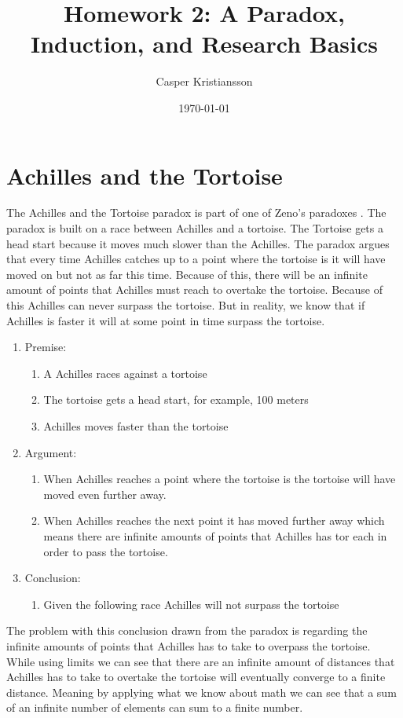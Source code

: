 \documentclass{article}
\title{Homework 2: A Paradox, Induction, and Research Basics}
\author{Casper Kristiansson}
\date{\today}
\begin{document}
\maketitle

\section{Achilles and the Tortoise}
The Achilles and the Tortoise paradox is part of one of Zeno's paradoxes \cite{black1951achilles}.  The paradox is built on a race between Achilles and a tortoise. The Tortoise gets a head start because it moves much slower than the Achilles. The paradox argues that every time Achilles catches up to a point where the tortoise is it will have moved on but not as far this time. Because of this, there will be an infinite amount of points that Achilles must reach to overtake the tortoise. Because of this Achilles can never surpass the tortoise. But in reality, we know that if Achilles is faster it will at some point in time surpass the tortoise. 

\begin{enumerate}
    \item Premise:
    \begin{enumerate}
        \item A Achilles races against a tortoise
        \item The tortoise gets a head start, for example, 100 meters
        \item Achilles moves faster than the tortoise
    \end{enumerate}
    \item Argument:
    \begin{enumerate}
        \item When Achilles reaches a point where the tortoise is the tortoise will have moved even further away.
        \item When Achilles reaches the next point it has moved further away which means there are infinite amounts of points that Achilles has tor each in order to pass the tortoise.
    \end{enumerate}
    \item Conclusion:
    \begin{enumerate}
        \item Given the following race Achilles will not surpass the tortoise
    \end{enumerate}
\end{enumerate}

The problem with this conclusion drawn from the paradox is regarding the infinite amounts of points that Achilles has to take to overpass the tortoise. While using limits we can see that there are an infinite amount of distances that Achilles has to take to overtake the tortoise will eventually converge to a finite distance. Meaning by applying what we know about math we can see that a sum of an infinite number of elements can sum to a finite number.
\end{document}
